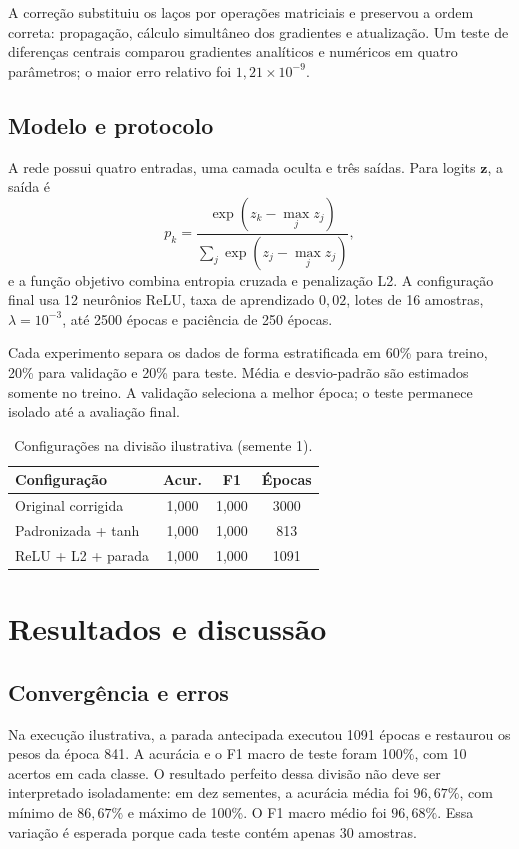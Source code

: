 \documentclass[10pt,twocolumn]{article}
\begin{document}
A correção substituiu os laços por operações matriciais e preservou a ordem correta: propagação, cálculo simultâneo dos gradientes e atualização. Um teste de diferenças centrais comparou gradientes analíticos e numéricos em quatro parâmetros; o maior erro relativo foi $1{,}21\times10^{-9}$.

\subsection{Modelo e protocolo}

A rede possui quatro entradas, uma camada oculta e três saídas. Para logits $\mathbf{z}$, a saída é
\begin{equation}
p_k=\frac{\exp(z_k-\max_j z_j)}{\sum_j\exp(z_j-\max_j z_j)},
\end{equation}
e a função objetivo combina entropia cruzada e penalização L2. A configuração final usa 12 neurônios ReLU, taxa de aprendizado $0{,}02$, lotes de 16 amostras, $\lambda=10^{-3}$, até 2500 épocas e paciência de 250 épocas.

Cada experimento separa os dados de forma estratificada em 60\% para treino, 20\% para validação e 20\% para teste. Média e desvio-padrão são estimados somente no treino. A validação seleciona a melhor época; o teste permanece isolado até a avaliação final.

\begin{table}[t]
\centering
\caption{Configurações na divisão ilustrativa (semente 1).}
\label{tab:config}
\small
\begin{tabular}{lccc}
\toprule
Configuração & Acur. & F1 & Épocas \\
\midrule
Original corrigida & 1,000 & 1,000 & 3000 \\
Padronizada + tanh & 1,000 & 1,000 & 813 \\
ReLU + L2 + parada & 1,000 & 1,000 & 1091 \\
\bottomrule
\end{tabular}
\end{table}

\section{Resultados e discussão}

\subsection{Convergência e erros}

Na execução ilustrativa, a parada antecipada executou 1091 épocas e restaurou os pesos da época 841. A acurácia e o F1 macro de teste foram 100\%, com 10 acertos em cada classe. O resultado perfeito dessa divisão não deve ser interpretado isoladamente: em dez sementes, a acurácia média foi $96{,}67\%$, com mínimo de $86{,}67\%$ e máximo de 100\%. O F1 macro médio foi $96{,}68\%$. Essa variação é esperada porque cada teste contém apenas 30 amostras.
\end{document}
